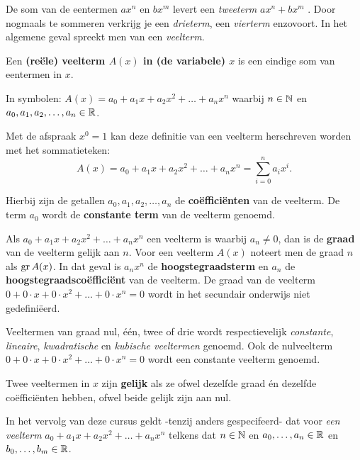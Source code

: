 \documentclass{ximera}
\begin{document}
\author{Koen de Naeghel - Wiskunde Op Maat}
    \xmsource



De som van de eentermen  \(ax^n\) en \(bx^m\) levert een \textit{tweeterm} \(ax^n + bx^m\) . Door nogmaals te sommeren verkrijg je een \textit{drieterm}, een \textit{vierterm} enzovoort. In het algemene geval spreekt men van een \textit{veelterm}.

\begin{definition} 
Een \textbf{(reële) veelterm \(A(x)\) in (de variabele) \(x\)} is een eindige som van eentermen in \(x\).

In symbolen: \(A(x) = a_0 + a_1x + a_2x^2 + \dots + a_n x^n\) waarbij \(n \in \mathbb{N}\) en \(a_0,a_1,a_2,\ldots,a_n \in \mathbb{R}\).


Met de afspraak \(x^0 = 1\) kan deze definitie van een veelterm herschreven worden met het sommatieteken:
\[
A(x) = a_0 + a_1x + a_2x^2 + \dots + a_n x^n = \sum_{i=0}^n a_i x^i.
\]

Hierbij zijn de getallen \(a_0, a_1, a_2, \ldots, a_n\) de \textbf{coëfficiënten} van de veelterm. De term \(a_0\) wordt de \textbf{constante term} van de veelterm genoemd.


Als \(a_0 + a_1x + a_2x^2 + \dots + a_n x^n\) een veelterm is waarbij \(a_n \neq 0\), dan is de \textbf{graad} van de veelterm gelijk aan \(n\). Voor een veelterm \(A(x)\) noteert men de graad \(n\) als \(\operatorname{gr} A(x)\). In dat geval is \(a_nx^n\) de \textbf{hoogstegraadsterm} en \(a_n\) de \textbf{hoogstegraadscoëfficiënt} van de veelterm. De graad van de veelterm \(0 + 0\cdot x + 0 \cdot x^2 + \dots + 0\cdot x^n = 0\) wordt in het secundair onderwijs niet gedefiniëerd.

Veeltermen van graad nul, één, twee of drie wordt respectievelijk \textit{constante}, \textit{lineaire}, \linebreak \textit{kwadratische} en \textit{kubische veeltermen} genoemd. Ook de nulveelterm \(0 + 0\cdot x + 0 \cdot x^2 + \dots + 0\cdot x^n = 0\) wordt een constante veelterm genoemd.


Twee veeltermen in \(x\) zijn \textbf{gelijk} als ze ofwel dezelfde graad én dezelfde coëfficiënten hebben, ofwel beide gelijk zijn aan nul. 


\end{definition}




\begin{notation}
    
    In het vervolg van deze cursus geldt -tenzij anders gespecifeerd- dat voor \textit{ een veelterm} \(a_0 + a_1x + a_2x^2 + \dots + a_n x^n\) telkens dat \(n \in \mathbb{N}\) en \(a_0, \ldots, a_n\in \mathbb{R}\) en \(b_0, \ldots, b_m\in \mathbb{R}\).
    
\end{notation}
\end{document}
